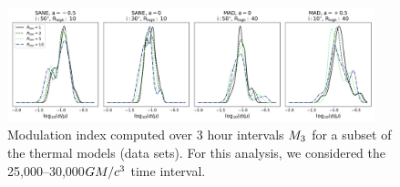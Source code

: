 \begin{figure}
  \centering
  \includegraphics[width=0.95\textwidth]{figures/mi_rlow_select_models.png}
  \caption{Modulation index computed over 3 hour intervals $M_{3}$ for a subset of the thermal models (\kharma data sets). For this analysis, we considered the 25,000--30,000$GM/c^3$ time interval.}
  \label{fig:mi_rlow}
\end{figure}



